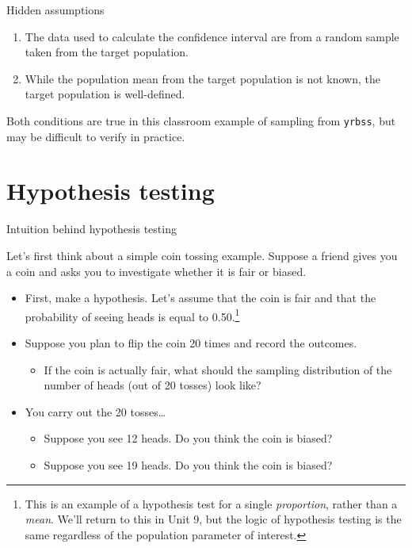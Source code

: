 \documentclass[
  ignorenonframetext,
  aspectratio=169]{beamer}
\providecommand{\tightlist}{%
  \setlength{\itemsep}{0pt}\setlength{\parskip}{0pt}}
\begin{document}
\begin{frame}{Hidden assumptions}
\protect\hypertarget{hidden-assumptions}{}
\small

\begin{enumerate}
\item
  The data used to calculate the confidence interval are from a random
  sample taken from the target population.
\item
  While the population mean from the target population is not known, the
  target population is well-defined.
\end{enumerate}

Both conditions are true in this classroom example of sampling from
\texttt{yrbss}, but may be difficult to verify in practice.
\end{frame}

\hypertarget{hypothesis-testing}{%
\section{Hypothesis testing}\label{hypothesis-testing}}

\begin{frame}{Intuition behind hypothesis testing}
\protect\hypertarget{intuition-behind-hypothesis-testing}{}
\small

Let's first think about a simple coin tossing example. Suppose a friend
gives you a coin and asks you to investigate whether it is fair or
biased.

\begin{itemize}
\item
  First, make a hypothesis. Let's assume that the coin is fair and that
  the probability of seeing heads is equal to
  0.50.\footnote{This is an example of a hypothesis test for a single \textit{proportion}, rather than a \textit{mean}. We'll return to this in Unit 9, but the logic of hypothesis testing is the same regardless of the population parameter of interest.}
\item
  Suppose you plan to flip the coin 20 times and record the outcomes.

  \begin{itemize}
  \tightlist
  \item
    If the coin is actually fair, what should the sampling distribution
    of the number of heads (out of 20 tosses) look like?
  \end{itemize}
\item
  You carry out the 20 tosses\ldots{}

  \begin{itemize}
  \item
    Suppose you see 12 heads. Do you think the coin is biased?
  \item
    Suppose you see 19 heads. Do you think the coin is biased?
  \end{itemize}
\end{itemize}
\end{frame}
\end{document}
